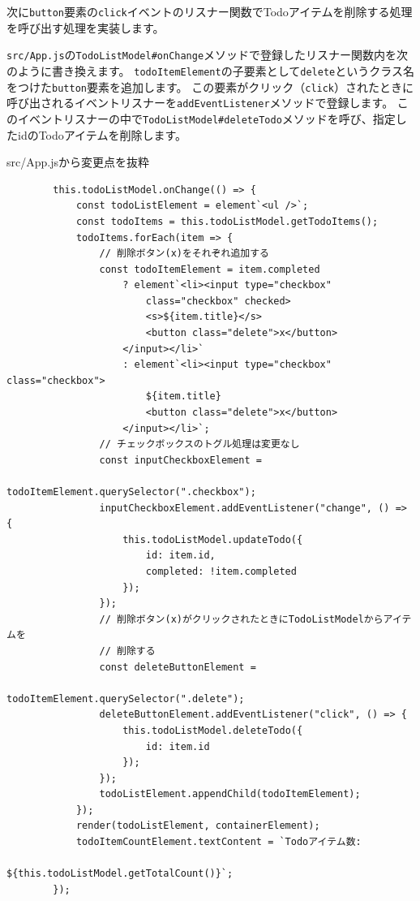 次に\texttt{button}要素の\texttt{click}イベントのリスナー関数でTodoアイテムを削除する処理を呼び出す処理を実装します。

\texttt{src/App.js}の\texttt{TodoListModel\#onChange}メソッドで登録したリスナー関数内を次のように書き換えます。
\texttt{todoItemElement}の子要素として\texttt{delete}というクラス名をつけた\texttt{button}要素を追加します。
この要素がクリック（\texttt{click}）されたときに呼び出されるイベントリスナーを\texttt{addEventListener}メソッドで登録します。
このイベントリスナーの中で\texttt{TodoListModel\#deleteTodo}メソッドを呼び、指定したidのTodoアイテムを削除します。

\begin{listtitle}
src/App.jsから変更点を抜粋
\end{listtitle}
\begin{lstlisting}
        this.todoListModel.onChange(() => {
            const todoListElement = element`<ul />`;
            const todoItems = this.todoListModel.getTodoItems();
            todoItems.forEach(item => {
                // 削除ボタン(x)をそれぞれ追加する
                const todoItemElement = item.completed
                    ? element`<li><input type="checkbox" 
                        class="checkbox" checked>
                        <s>${item.title}</s>
                        <button class="delete">x</button>
                    </input></li>`
                    : element`<li><input type="checkbox" class="checkbox">
                        ${item.title}
                        <button class="delete">x</button>
                    </input></li>`;
                // チェックボックスのトグル処理は変更なし
                const inputCheckboxElement = 
                                  todoItemElement.querySelector(".checkbox");
                inputCheckboxElement.addEventListener("change", () => {
                    this.todoListModel.updateTodo({
                        id: item.id,
                        completed: !item.completed
                    });
                });
                // 削除ボタン(x)がクリックされたときにTodoListModelからアイテムを
                // 削除する
                const deleteButtonElement = 
                                    todoItemElement.querySelector(".delete");
                deleteButtonElement.addEventListener("click", () => {
                    this.todoListModel.deleteTodo({
                        id: item.id
                    });
                });
                todoListElement.appendChild(todoItemElement);
            });
            render(todoListElement, containerElement);
            todoItemCountElement.textContent = `Todoアイテム数: 
                                      ${this.todoListModel.getTotalCount()}`;
        });
\end{lstlisting}
\listend

